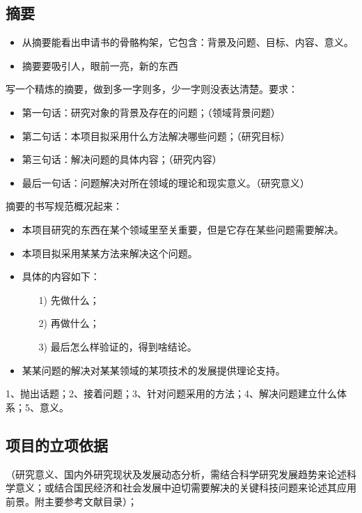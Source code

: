 \subsection{摘要}
\begin{itemize}
\item {\color{red}从摘要能看出申请书的骨骼构架，它包含：背景及问题、目标、内容、意义。}
\item 摘要要吸引人，眼前一亮，新的东西
\end{itemize}

写一个精炼的摘要，做到多一字则多，少一字则没表达清楚。要求：
\begin{itemize}
\item 第一句话：研究对象的背景及存在的问题；（领域背景问题）
\item 第二句话：本项目拟采用什么方法解决哪些问题；（研究目标）
\item 第三句话：解决问题的具体内容；（研究内容）
\item 最后一句话：问题解决对所在领域的理论和现实意义。（研究意义）
\end{itemize}

摘要的书写规范概况起来：
\begin{itemize}
\item 本项目研究的东西在某个领域里至关重要，但是它存在某些问题需要解决。
\item 本项目拟采用某某方法来解决这个问题。
\item 具体的内容如下：
	\begin{itemize}
	\item[1)] 先做什么；
	\item[2)] 再做什么；
	\item[3)] 最后怎么样验证的，得到啥结论。
	\end{itemize}
\item 某某问题的解决对某某领域的某项技术的发展提供理论支持。
\end{itemize}

1、抛出话题；2、接着问题；3、针对问题采用的方法；4、解决问题建立什么体系；5、意义。


\subsection{项目的立项依据}
（研究意义、国内外研究现状及发展动态分析，需结合科学研究发展趋势来论述科学意义；或结合国民经济和社会发展中迫切需要解决的关键科技问题来论述其应用前景。附主要参考文献目录）；

